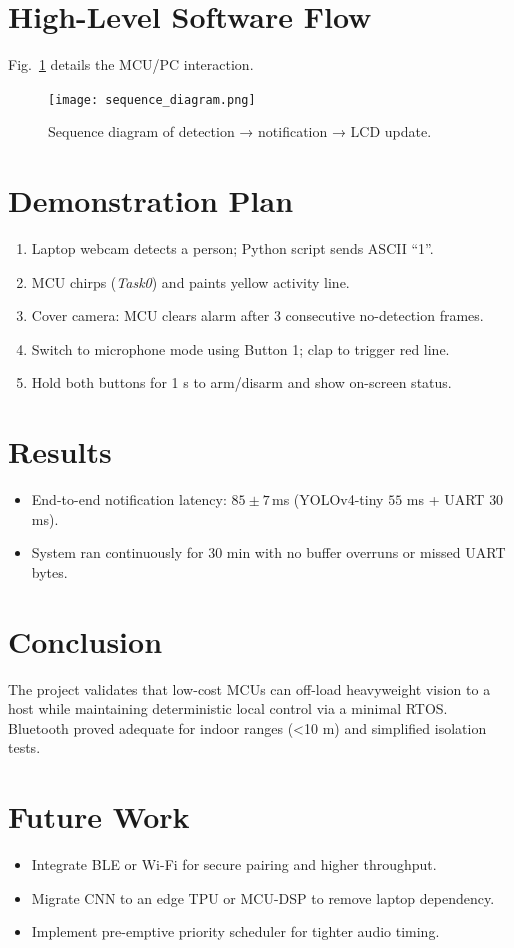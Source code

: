 \documentclass[11pt]{IEEEtran}
\begin{document}
\section{High-Level Software Flow}
Fig.~\ref{fig:seq} details the MCU/PC interaction.

\begin{figure}[t]
\centering
\texttt{[image: sequence\_diagram.png]}
\caption{Sequence diagram of detection → notification → LCD update.}
\label{fig:seq}
\end{figure}

\section{Demonstration Plan}
\begin{enumerate}
  \item Laptop webcam detects a person; Python script sends ASCII ``1''.
  \item MCU chirps (\textit{Task0}) and paints yellow activity line.
  \item Cover camera: MCU clears alarm after 3 consecutive no-detection frames.
  \item Switch to microphone mode using Button 1; clap to trigger red line.
  \item Hold both buttons for 1 s to arm/disarm and show on-screen status.
\end{enumerate}

\section{Results}
\begin{itemize}
  \item End-to-end notification latency: $85\pm 7\,$ms  
        (YOLOv4-tiny $55$ ms + UART $30$ ms).
  \item System ran continuously for 30 min with no buffer overruns
        or missed UART bytes.
\end{itemize}

\section{Conclusion}
The project validates that low-cost MCUs can off-load heavyweight vision
to a host while maintaining deterministic local control via a minimal
RTOS.  Bluetooth proved adequate for indoor ranges (\textless10 m) and
simplified isolation tests.

\section{Future Work}
\begin{itemize}
  \item Integrate BLE or Wi-Fi for secure pairing and higher throughput.
  \item Migrate CNN to an edge TPU or MCU-DSP to remove laptop
        dependency.
  \item Implement pre-emptive priority scheduler for tighter audio timing.
\end{itemize}
\end{document}
